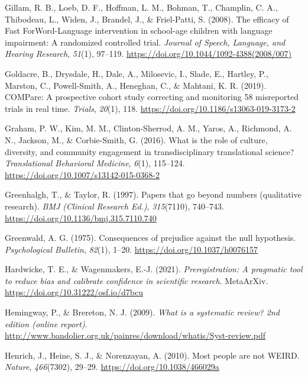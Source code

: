 \documentclass{krantz}
\newlength{\cslhangindent}
\newlength{\cslentryspacingunit} %
\newenvironment{CSLReferences}[2] %
{%
\setlength{\parindent}{0pt}
\ifodd #1
\let\oldpar\par
\def\par{\hangindent=\cslhangindent\oldpar}
\fi
\setlength{\parskip}{#2\cslentryspacingunit}
}%
{}
\begin{document}
\begin{CSLReferences}{1}{0}
\leavevmode{}%
Gillam, R. B., Loeb, D. F., Hoffman, L. M., Bohman, T., Champlin, C. A., Thibodeau, L., Widen, J., Brandel, J., \& Friel-Patti, S. (2008). The efficacy of {Fast ForWord-Language} intervention in school-age children with language impairment: {A} randomized controlled trial. \emph{Journal of Speech, Language, and Hearing Research}, \emph{51}(1), 97--119. \url{https://doi.org/10.1044/1092-4388(2008/007)}

\leavevmode{}%
Goldacre, B., Drysdale, H., Dale, A., Milosevic, I., Slade, E., Hartley, P., Marston, C., Powell-Smith, A., Heneghan, C., \& Mahtani, K. R. (2019). {COMPare}: A prospective cohort study correcting and monitoring 58 misreported trials in real time. \emph{Trials}, \emph{20}(1), 118. \url{https://doi.org/10.1186/s13063-019-3173-2}

\leavevmode{}%
Graham, P. W., Kim, M. M., Clinton-Sherrod, A. M., Yaros, A., Richmond, A. N., Jackson, M., \& Corbie-Smith, G. (2016). What is the role of culture, diversity, and community engagement in transdisciplinary translational science? \emph{Translational Behavioral Medicine}, \emph{6}(1), 115--124. \url{https://doi.org/10.1007/s13142-015-0368-2}

\leavevmode{}%
Greenhalgh, T., \& Taylor, R. (1997). Papers that go beyond numbers (qualitative research). \emph{BMJ (Clinical Research Ed.)}, \emph{315}(7110), 740--743. \url{https://doi.org/10.1136/bmj.315.7110.740}

\leavevmode{}%
Greenwald, A. G. (1975). Consequences of prejudice against the null hypothesis. \emph{Psychological Bulletin}, \emph{82}(1), 1--20. \url{https://doi.org/10.1037/h0076157}

\leavevmode{}%
Hardwicke, T. E., \& Wagenmakers, E.-J. (2021). \emph{Preregistration: {A} pragmatic tool to reduce bias and calibrate confidence in scientific research}. {MetaArXiv}. \url{https://doi.org/10.31222/osf.io/d7bcu}

\leavevmode{}%
Hemingway, P., \& Brereton, N. J. (2009). \emph{What is a systematic review? 2nd edition (online report)}. \url{http://www.bandolier.org.uk/painres/download/whatis/Syst-review.pdf}

\leavevmode{}%
Henrich, J., Heine, S. J., \& Norenzayan, A. (2010). Most people are not {WEIRD}. \emph{Nature}, \emph{466}(7302), 29--29. \url{https://doi.org/10.1038/466029a}


\end{CSLReferences}
\end{document}

